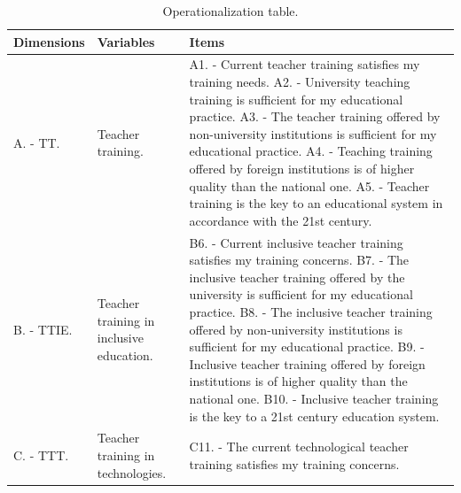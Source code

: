 \documentclass[english]{textolivre}
\begin{document}
\begin{longtable}{p{}p{}p{}}
\caption{Operationalization table.}
\label{tab1}
\\ 
\toprule 
Dimensions & Variables & Items \\ 
\midrule
\arrayrulecolor[gray]{.7}
A. - TT. \newline \textcite{nieva2016} \newline \textcite{rodriguez2021} & Teacher training. & 
\multicolumn{1}{p{0.5\textwidth}}{A1. - Current teacher training satisfies my training needs. \newline
A2. - University teaching training is sufficient for my educational practice. \newline
A3. - The teacher training offered by non-university institutions is sufficient for my educational practice. \newline
A4. - Teaching training offered by foreign institutions is of higher quality than the national one. \newline
A5. - Teacher training is the key to an educational system in accordance with the 21st century.}
\\
\midrule
B. - TTIE. \newline \textcite{booth2000} \newline \textcite{arnaiz2019} \newline \textcite{moreno2020} & Teacher training in inclusive education. & \multicolumn{1}{p{0.5\textwidth}}{B6. - Current inclusive teacher training satisfies my training concerns. \newline
B7. - The inclusive teacher training offered by the university is sufficient for my educational practice. \newline
B8. - The inclusive teacher training offered by non-university institutions is sufficient for my educational practice. \newline
B9. - Inclusive teacher training offered by foreign institutions is of higher quality than the national one. \newline
B10. - Inclusive teacher training is the key to a 21st century education system.}
\\
\midrule
C. - TTT. \newline \textcite{talavera2020} \newline \textcite{dussel2020} \newline \textcite{suarez2020} & Teacher training in technologies. & \multicolumn{1}{p{0.5\textwidth}}{C11. - The current technological teacher training satisfies my training concerns. \newline
}
\end{longtable}
\end{document}
